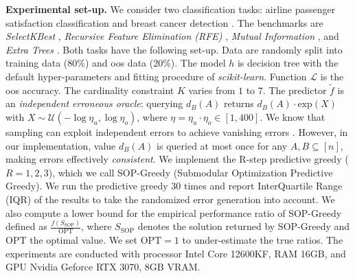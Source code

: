 \textbf{Experimental set-up.} We consider two classification tasks: airline passenger satisfaction classification \cite{jiang2022forecast} and breast cancer detection \cite{assegie2021breast}. The benchmarks are \textit{SelectKBest} \cite{otchere2022application}, \textit{Recursive Feature Elimination (RFE)} \cite{sachdeva2022systematic}, \textit{Mutual Information} \cite{feature-selection}, and \textit{Extra Trees} \cite{extra-trees}. %
Both tasks have the following set-up. 
Data are randomly split into training data (80\%) and oos data (20\%). The model $h$ is decision tree with the default hyper-parameters and fitting procedure of \textit{scikit-learn}. 
Function $\mathcal{L}$ is the oos accuracy. 
The cardinality constraint $K$ varies from $1$ to $7$. 
The predictor $\tilde{f}$ is an \textit{independent erroneous oracle}: querying $d_B(A)$ returns $d_B(A) \cdot \text{exp}(X)$ with $X \sim \mathcal{U}(-\log \eta_u, \log \eta_o)$, where $\eta = \eta_u \cdot \eta_o \in [1, 400]$. We know that sampling can exploit independent errors to achieve vanishing errors \cite{submodularOptNoisetoImageCollection}. However, in our implementation, value $d_B(A)$ is queried at most once for any $A, B \subseteq [n]$, making errors effectively \textit{consistent}. 
We implement the R-step predictive greedy ($R = 1, 2, 3$), which we call SOP-Greedy (Submodular Optimization Predictive Greedy). %
We run the predictive greedy 30 times and report InterQuartile Range (IQR) of the results to take the randomized error generation into account. We also compute a lower bound for the empirical performance ratio of SOP-Greedy defined as $\frac{f(S_{\text{SOP}})}{\mathrm{OPT}}$, where $S_{\text{SOP}}$ denotes the solution returned by SOP-Greedy and OPT the optimal value. We set $\text{OPT} = 1$ to under-estimate the true ratios. The experiments are conducted with processor Intel Core 12600KF, RAM 16GB, and GPU Nvidia Geforce RTX 3070, 8GB VRAM. 


